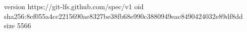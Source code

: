 version https://git-lfs.github.com/spec/v1
oid sha256:8ef055a4cc2215690ae8327be38fb68e990c3880949eac8490424032e89df8dd
size 5566
